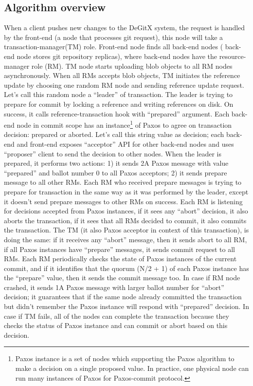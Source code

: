 \documentclass[sigplan, screen, nonacm, 11pt]{acmart}
\begin{document}
\subsection{Algorithm overview}

When a client pushes new changes to the DeGitX system, the request is handled by the front-end (a node that processes
git request), this node will take a transaction-manager(TM) role. Front-end node finds all back-end nodes (
back-end node stores git repository replicas), where back-end nodes have the resource-manager role (RM).
TM node starts uploading blob objects to all RM nodes asynchronously. When all RMs accepts blob objects,
TM initiates the reference update by choosing one random RM node and sending reference update request.
Let's call this random node a ``leader'' of transaction. The leader is trying to prepare for commit by
locking a reference and writing references on disk. On success, it calls reference-transaction hook with ``prepared''
argument. Each back-end node in commit scope has an instance\footnote{Paxos instance is a set of nodes
which supporting the Paxos algorithm to make a decision on a single proposed value. In practice, one physical node
can run many instances of Paxos for Paxos-commit protocol.} of Paxos to agree on transaction decision: prepared or aborted.
Let's call this string value as decision;
each back-end and front-end exposes ``acceptor'' API for other back-end nodes and uses ``proposer'' client to send
the decision to other nodes. When the leader is prepared, it performs two actions: 1) it sends 2A Paxos message with value
``prepared'' and ballot number 0 to all Paxos acceptors; 2) it sends prepare message to all other RMs.
Each RM who received prepare messages is trying to prepare for transaction in the same way as it was performed by the leader,
except it doesn't send prepare messages to other RMs on success. Each RM is listening for decisions accepted from Paxos
instances, if it sees any ``abort'' decision, it also aborts the transaction, if it sees that all RMs decided to commit,
it also commits the transaction. The TM (it also Paxos acceptor in context of this transaction), is doing the same:
if it receives any ``abort'' message, then it sends abort to all RM, if all Paxos instances have ``prepare'' messages,
it sends commit request to all RMs. Each RM periodically checks the state of Paxos instances of the current commit, and if it identifies
that the quorum (N/2 + 1) of each Paxos instance has the ``prepare'' value, then it sends the commit message too.
In case if RM node crashed, it sends 1A Paxos message with larger ballot number for ``abort'' decision; it guarantees
that if the same node already committed the transaction but didn't remember the Paxos instance will respond with
``prepared'' decision. In case if TM fails, all of the nodes can complete the transaction because they checks the status
of Paxos instance and can commit or abort based on this decision.
\end{document}
